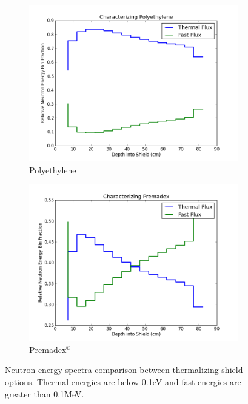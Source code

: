 \documentclass{mc2015}
\begin{document}
\begin{figure}
	\centering
	\begin{subfigure}{0.49\textwidth}
		\includegraphics[width=\textwidth]{Poly_char.png}
		\caption{Polyethylene}
		\label{fig:polychar}
	\end{subfigure}
	\begin{subfigure}{0.49\textwidth}
		\includegraphics[width=\textwidth]{Prem_char.png}
		\caption{Premadex$^\circledR$}
		\label{fig:premchar}
	\end{subfigure}
	\caption{Neutron energy spectra comparison between thermalizing shield options. Thermal energies are below 0.1eV and fast energies are greater than 0.1MeV.}
	\label{fig:chars}
\end{figure}
\end{document}
